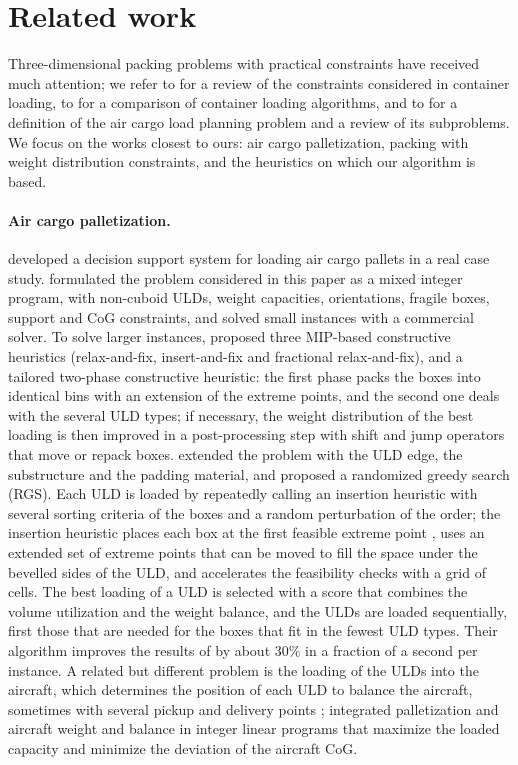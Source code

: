 \section{Related work}
\label{sec:literature}

Three-dimensional packing problems with practical constraints have received much attention; we
refer to \citet{Bortfeldt2013} for a review of the constraints considered in container loading,
to \citet{Zhao2016} for a comparison of container loading algorithms, and to
\citet{Brandt2019} for a definition of the air cargo load planning problem and a review of its
subproblems. We focus on the works closest to ours: air cargo palletization, packing with
weight distribution constraints, and the heuristics on which our algorithm is based.

\paragraph{Air cargo palletization.}
\citet{Chan2006} developed a decision support system for loading air cargo pallets in a real
case study. \citet{Paquay2016} formulated the problem considered in this paper as a mixed
integer program, with non-cuboid ULDs, weight capacities, orientations, fragile boxes, support
and CoG constraints, and solved small instances with a commercial solver. To solve larger
instances, \citet{Paquay2018a} proposed three MIP-based constructive heuristics (relax-and-fix,
insert-and-fix and fractional relax-and-fix), and \citet{Paquay2018b} a tailored two-phase
constructive heuristic: the first phase packs the boxes into identical bins with an extension of
the extreme points, and the second one deals with the several ULD types; if necessary, the weight distribution of
the best loading is then improved in a post-processing step with shift and jump operators that
move or repack boxes. \citet{Hessler2025}
extended the problem with the ULD edge, the substructure and the padding material, and proposed a
randomized greedy search (RGS). Each ULD is loaded by repeatedly calling an insertion heuristic
with several sorting criteria of the boxes and a random perturbation of the order; the
insertion heuristic places each box at the first feasible extreme point
\citep{Crainic2008}, uses an extended set of extreme points that can be moved to fill the space
under the bevelled sides of the ULD, and accelerates the feasibility checks with a grid of
cells. The best loading of a ULD is selected with a score that combines the volume utilization
and the weight balance, and the ULDs are loaded sequentially, first those that are needed for
the boxes that fit in the fewest ULD types. Their algorithm improves the results of
\citet{Paquay2018b} by about 30\% in a fraction of a second per instance. A related but
different problem is the loading of the ULDs into the aircraft, which determines the position of
each ULD to balance the aircraft, sometimes with several pickup and delivery points
\citep{Lurkin2015,Mesquita2026}; \citet{Zhao2023} integrated palletization and aircraft weight
and balance in integer linear programs that maximize the loaded capacity and minimize the
deviation of the aircraft CoG.

